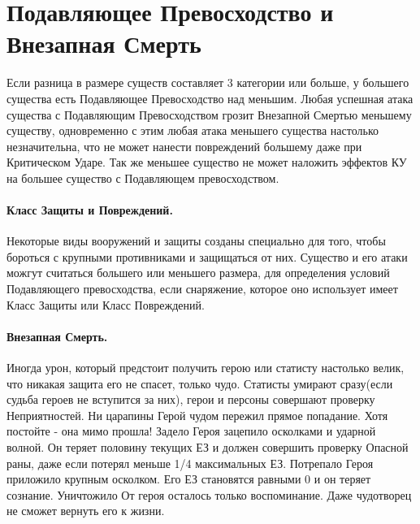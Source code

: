 \section{Подавляющее Превосходство и Внезапная Смерть}
Если разница в размере существ составляет 3 категории или больше, у большего существа есть Подавляющее Превосходство над меньшим. Любая успешная атака существа с Подавляющим Превосходством грозит Внезапной Смертью меньшему существу, одновременно с этим любая атака меньшего существа настолько незначительна, что не может нанести повреждений большему даже при Критическом Ударе. Так же меньшее существо не может наложить эффектов КУ на большее существо с Подавляющем превосходством.
\paragraph{Класс Защиты и Повреждений.} Некоторые виды вооружений и защиты созданы специально для того, чтобы бороться с крупными противниками и защищаться от них. Существо и его атаки можгут считаться большего или меньшего размера, для определения условий Подавляющего превосходства, если снаряжение, которое оно использует имеет Класс Защиты или Класс Повреждений.

\paragraph{Внезапная Смерть.} Иногда урон, который предстоит получить герою или статисту настолько велик, что никакая защита его не спасет, только чудо. Статисты умирают сразу(если судьба героев не вступится за них), герои и персоны совершают проверку Неприятностей.
\trouble
{Ни царапины}%
{Герой чудом пережил прямое попадание. Хотя постойте - она мимо прошла!}%
{Задело}%
{Героя зацепило осколками и ударной волной. Он теряет половину текущих ЕЗ и должен совершить проверку Опасной раны, даже если потерял меньше 1/4 максимальных ЕЗ.}%
{Потрепало}%
{Героя приложило крупным осколком. Его ЕЗ становятся равными 0 и он теряет сознание.}%
{Уничтожило}%
{От героя осталось только воспоминание. Даже чудотворец не сможет вернуть его к жизни.}%
